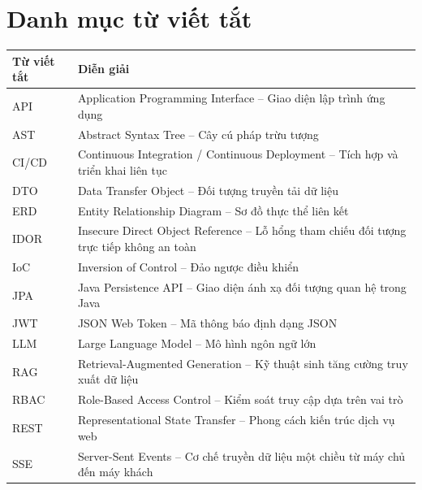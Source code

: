 \documentclass[12pt,a4paper]{report}
\begin{document}
\listoffigures
\cleardoublepage

\listoftables
\cleardoublepage

\chapter*{Danh mục từ viết tắt}

\begin{table}[H]
\centering
\renewcommand{\arraystretch}{1.2}
\begin{tabular}{|p{2.5cm}|p{11.5cm}|}
\hline
\textbf{Từ viết tắt} & \textbf{Diễn giải} \\ \hline
API & Application Programming Interface -- Giao diện lập trình ứng dụng \\ \hline
AST & Abstract Syntax Tree -- Cây cú pháp trừu tượng \\ \hline
CI/CD & Continuous Integration / Continuous Deployment -- Tích hợp và triển khai liên tục \\ \hline
DTO & Data Transfer Object -- Đối tượng truyền tải dữ liệu \\ \hline
ERD & Entity Relationship Diagram -- Sơ đồ thực thể liên kết \\ \hline
IDOR & Insecure Direct Object Reference -- Lỗ hổng tham chiếu đối tượng trực tiếp không an toàn \\ \hline
IoC & Inversion of Control -- Đảo ngược điều khiển \\ \hline
JPA & Java Persistence API -- Giao diện ánh xạ đối tượng quan hệ trong Java \\ \hline
JWT & JSON Web Token -- Mã thông báo định dạng JSON \\ \hline
LLM & Large Language Model -- Mô hình ngôn ngữ lớn \\ \hline
RAG & Retrieval-Augmented Generation -- Kỹ thuật sinh tăng cường truy xuất dữ liệu \\ \hline
RBAC & Role-Based Access Control -- Kiểm soát truy cập dựa trên vai trò \\ \hline
REST & Representational State Transfer -- Phong cách kiến trúc dịch vụ web \\ \hline
SSE & Server-Sent Events -- Cơ chế truyền dữ liệu một chiều từ máy chủ đến máy khách \\ \hline
\end{tabular}
\end{table}
\cleardoublepage

\end{document}
